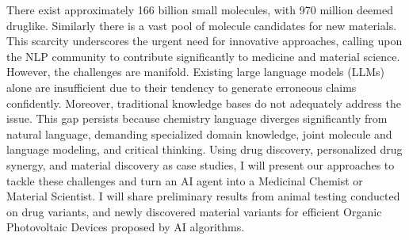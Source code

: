 There exist approximately 166 billion small molecules, with 970 million deemed druglike. Similarly there is a vast pool of molecule candidates for new materials. This scarcity underscores the urgent need for innovative approaches, calling upon the NLP community to contribute significantly to medicine and material science. However, the challenges are manifold. Existing large language models (LLMs) alone are insufficient due to their tendency to generate erroneous claims confidently. Moreover, traditional knowledge bases do not adequately address the issue. This gap persists because chemistry language diverges significantly from natural language, demanding specialized domain knowledge, joint molecule and language modeling, and critical thinking. Using drug discovery, personalized drug synergy, and material discovery as case studies, I will present our approaches to tackle these challenges and turn an AI agent into a Medicinal Chemist or Material Scientist. I will share preliminary results from animal testing conducted on drug variants, and newly discovered material variants for efficient Organic Photovoltaic Devices proposed by AI algorithms.